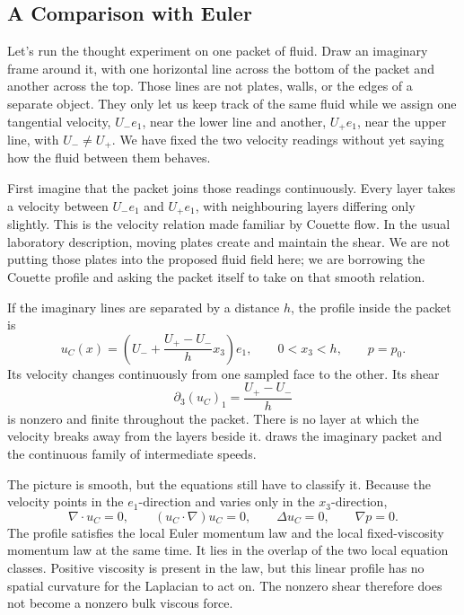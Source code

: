 \subsection{A Comparison with Euler}\label{sub:AComparisonWithEuler}

Let's run the thought experiment on one packet of fluid.
Draw an imaginary frame around it, with one horizontal line across the bottom of the packet and another across the top.
Those lines are not plates, walls, or the edges of a separate object.
They only let us keep track of the same fluid while we assign one tangential velocity, \(U_-e_1\), near the lower line and another, \(U_+e_1\), near the upper line, with \(U_-\neq U_+\).
We have fixed the two velocity readings without yet saying how the fluid between them behaves.

First imagine that the packet joins those readings continuously.
Every layer takes a velocity between \(U_-e_1\) and \(U_+e_1\), with neighbouring layers differing only slightly.
This is the velocity relation made familiar by Couette flow.
In the usual laboratory description, moving plates create and maintain the shear.
We are not putting those plates into the proposed fluid field here; we are borrowing the Couette profile and asking the packet itself to take on that smooth relation.

If the imaginary lines are separated by a distance \(h\), the profile inside the packet is
\[
  u_C(x)
  =
  \left(
    U_-+\frac{U_+-U_-}{h}x_3
  \right)e_1,
  \qquad
  0<x_3<h,
  \qquad
  p=p_0.
\]
Its velocity changes continuously from one sampled face to the other.
Its shear
\[
  \partial_3(u_C)_1
  =
  \frac{U_+-U_-}{h}
\]
is nonzero and finite throughout the packet.
There is no layer at which the velocity breaks away from the layers beside it.
 draws the imaginary packet and the continuous family of intermediate speeds.



The picture is smooth, but the equations still have to classify it.
Because the velocity points in the \(e_1\)-direction and varies only in the \(x_3\)-direction,
\[
  \nabla\cdot u_C=0,
  \qquad
  (u_C\cdot\nabla)u_C=0,
  \qquad
  \Delta u_C=0,
  \qquad
  \nabla p=0.
\]
The profile satisfies the local Euler momentum law and the local fixed-viscosity \NavierStokes{} momentum law at the same time.
It lies in the overlap of the two local equation classes.
Positive viscosity is present in the \NavierStokes{} law, but this linear profile has no spatial curvature for the Laplacian to act on.
The nonzero shear therefore does not become a nonzero bulk viscous force.

